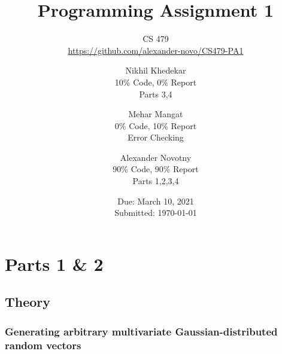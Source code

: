\documentclass[headings=optiontoheadandtoc,listof=totoc,parskip=full]{scrartcl}
\title{Programming Assignment 1}
\subtitle{CS 479\\\url{https://github.com/alexander-novo/CS479-PA1}}
\author{Nikhil Khedekar\\10\% Code, 0\% Report\\ Parts 3,4 \and Mehar Mangat\\0\% Code,  10\% Report\\ Error Checking  \and Alexander Novotny\\90\% Code, 90\% Report\\ Parts 1,2,3,4}
\date{Due: March 10, 2021 \\ Submitted: \today}
\begin{document}
\maketitle
\tableofcontents
{}

\newpage
{}

\section{Parts 1 \& 2}
\label{sec:part-1}

\subsection{Theory}

\subsubsection{Generating arbitrary multivariate Gaussian-distributed random vectors}
\end{document}
